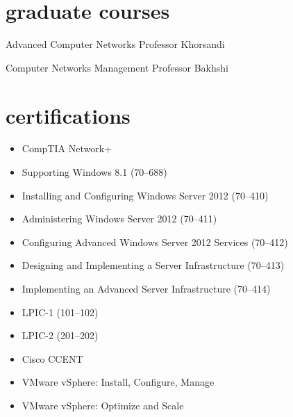 \documentclass[]{friggeri-cv} %
\begin{document}
\section{graduate courses}

\begin{entrylist}

	{Advanced Computer Networks}
	{Professor Khorsandi}
	{}


	{Computer Networks Management}
	{Professor Bakhshi}
	{}



\end{entrylist}
\pagebreak


\section{certifications}
\begin{itemize}
	\item CompTIA Network+
	\item Supporting Windows 8.1 (70--688)
	\item Installing and Configuring Windows Server 2012 (70--410)
	\item Administering Windows Server 2012 (70--411)
	\item Configuring Advanced Windows Server 2012 Services (70--412)
	\item Designing and Implementing a Server Infrastructure (70--413)
	\item Implementing an Advanced Server Infrastructure (70--414)
	\item LPIC-1 (101--102)
	\item LPIC-2 (201--202)
	\item Cisco CCENT
	\item VMware vSphere: Install, Configure, Manage
	\item VMware vSphere: Optimize and Scale
\end{itemize}
\end{document}
